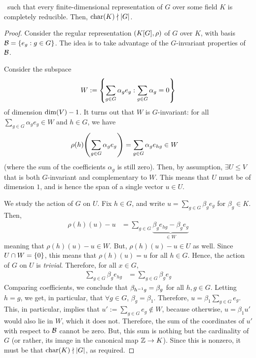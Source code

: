 \begin{boxtheorem} \label{Ch1:Thm:Maschke_Converse}
    \ such that every finite-dimensional representation of $G$ over some field $K$ is completely reducible. Then, $\operatorname{char}\!\left( K \right) \nmid \left\lvert G \right\rvert$.
\end{boxtheorem}
\begin{proof}
    Consider the regular representation $\left( K[G], \rho \right)$ of $G$ over $K$, with basis $\mathcal{B} = \left\{ e_g : g \in G \right\}$. The idea is to take advantage of the $G$-invariant properties of $\mathcal{B}$.

    Consider the subspace
    \begin{align*}
        W := \left\{ \sum_{g \in G} \alpha_g e_g : \sum_{g \in G} \alpha_g = 0 \right\}
    \end{align*}
    of dimension $\dim\!\left( V \right) - 1$. It turns out that $W$ is $G$-invariant: for all $\sum_{g \in G} \alpha_g e_g \in W$ and $h \in G$, we have
    \begin{align*}
        \rho(h)\!\left( \sum_{g \in G} \alpha_g e_g \right) &= \sum_{g \in G} \alpha_g e_{hg} \in W
    \end{align*}
    (where the sum of the coefficients $\alpha_g$ is still zero). Then, by assumption, $\exists U \leq V$ that is both $G$-invariant and complementary to $W$. This means that $U$ must be of dimension $1$, and is hence the span of a single vector $u \in U$.

    We study the action of $G$ on $U$. Fix $h \in G$, and write $u = \sum_{g \in G} \beta_g e_g$ for $\beta_g \in K$. Then,
    \begin{align*}
        \rho(h)(u) - u
        &= \sum_{g \in G} \underbrace{\beta_g e_{hg} - \beta_g e_g}_{\in W}
    \end{align*}
    meaning that $\rho(h)(u) - u \in W$. But, $\rho(h)(u) - u \in U$ as well. Since $U \cap W = \left\{ 0 \right\}$, this means that $\rho(h)(u) = u$ for all $h \in G$. Hence, the action of $G$ on $U$ is \textit{trivial}. Therefore, for all $x \in G$,
    \begin{align*}
        \sum_{g \in G} \beta_g e_{hg} &= \sum_{g \in G} \beta_g e_g
    \end{align*}
    Comparing coefficients, we conclude that $\beta_{h^{-1} g} = \beta_g$ for all $h,g \in G$. Letting $h = g$, we get, in particular, that $\forall g \in G$, $\beta_g = \beta_1$. Therefore, $u = \beta_1 \sum_{g \in G} e_g$. This, in particular, implies that $u' := \sum_{g \in G} e_g \notin W$, because otherwise, $u = \beta_1 u'$ would also lie in $W$, which it does not. Therefore, the sum of the coordinates of $u'$ with respect to $\mathcal{B}$ cannot be zero. But, this sum is nothing but the cardinality of $G$ (or rather, its image in the canonical map $\mathbb{Z} \to K$). Since this is nonzero, it must be that $\operatorname{char}\!\left( K \right) \nmid \left\lvert G \right\rvert$, as required.
\end{proof}

